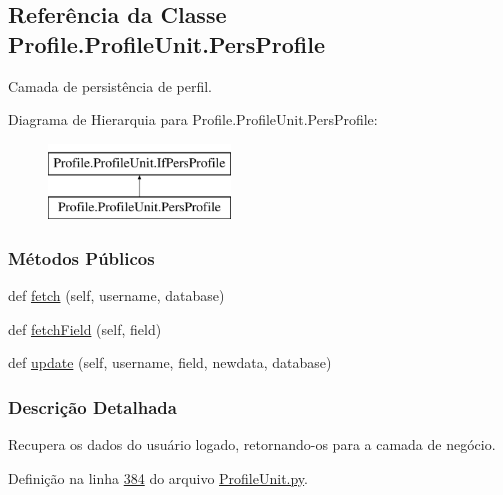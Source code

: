 \hypertarget{classProfile_1_1ProfileUnit_1_1PersProfile}{}\subsection{Referência da Classe Profile.\+Profile\+Unit.\+Pers\+Profile}
\label{classProfile_1_1ProfileUnit_1_1PersProfile}


Camada de persistência de perfil.  


Diagrama de Hierarquia para Profile.\+Profile\+Unit.\+Pers\+Profile\+:\begin{figure}[H]
\begin{center}
\leavevmode
\includegraphics[height=2.000000cm]{d7/dec/classProfile_1_1ProfileUnit_1_1PersProfile}
\end{center}
\end{figure}
\subsubsection*{Métodos Públicos}
\begin{DoxyCompactItemize}
\item 
def \hyperlink{classProfile_1_1ProfileUnit_1_1PersProfile_a6786051dcc78f2f481ab6170b47acd7c}{fetch} (self, username, database)
\item 
def \hyperlink{classProfile_1_1ProfileUnit_1_1PersProfile_abc02402fe65ceaabd7f3dea44d51999b}{fetch\+Field} (self, field)
\item 
def \hyperlink{classProfile_1_1ProfileUnit_1_1PersProfile_a8c6dec48c3beb92e0250261f1dfb81df}{update} (self, username, field, newdata, database)
\end{DoxyCompactItemize}


\subsubsection{Descrição Detalhada}
Recupera os dados do usuário logado, retornando-\/os para a camada de negócio. 

Definição na linha \hyperlink{ProfileUnit_8py_source_l00384}{384} do arquivo \hyperlink{ProfileUnit_8py_source}{Profile\+Unit.\+py}.



